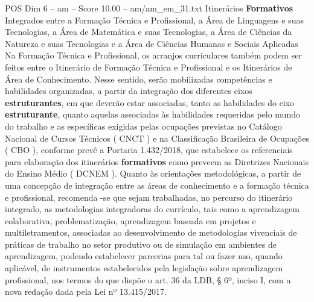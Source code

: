 \begin{textsample}{POS Dim 6 – am – Score 10.00 – am/am\_em\_31.txt}
Itinerários \textbf{Formativos} Integrados entre a Formação Técnica e Profissional, a Área de Linguagens e suas Tecnologias, a Área de Matemática e suas Tecnologias, a Área de Ciências da Natureza e suas Tecnologias e a Área de Ciências Humanas e Sociais Aplicadas Na Formação Técnica e Profissional, os arranjos curriculares também podem ser feitos entre o Itinerário de Formação Técnica e Profissional e os Itinerários de Área de Conhecimento.
Nesse sentido, serão mobilizadas competências e habilidades organizadas, a partir da integração dos diferentes eixos \textbf{estruturantes}, em que deverão estar associadas, tanto as habilidades do eixo \textbf{estruturante}, quanto aquelas associadas às habilidades requeridas pelo mundo do trabalho e as específicas exigidas pelas ocupações previstas no Catálogo Nacional de Cursos Técnicos ( CNCT ) e na Classificação Brasileira de Ocupações ( CBO ), conforme prevê a Portaria 1.432/2018, que estabelece os referenciais para elaboração dos itinerários \textbf{formativos} como preveem as Diretrizes Nacionais do Ensino Médio ( DCNEM ).
Quanto às orientações metodológicas, a partir de uma concepção de integração entre as áreas de conhecimento e a formação técnica e profissional, recomenda -se que sejam trabalhadas, no percurso do itinerário integrado, as metodologias integradoras do currículo, tais como a aprendizagem colaborativa, problematização, aprendizagem baseada em projetos e multiletramentos, associadas ao desenvolvimento de metodologias vivenciais de práticas de trabalho no setor produtivo ou de simulação em ambientes de aprendizagem, podendo estabelecer parcerias para tal ou fazer uso, quando aplicável, de instrumentos estabelecidos pela legislação sobre aprendizagem profissional, nos termos do que dispõe o art. 36 da LDB, § 6º, inciso I, com a nova redação dada pela Lei nº 13.415/2017.

\end{textsample}
